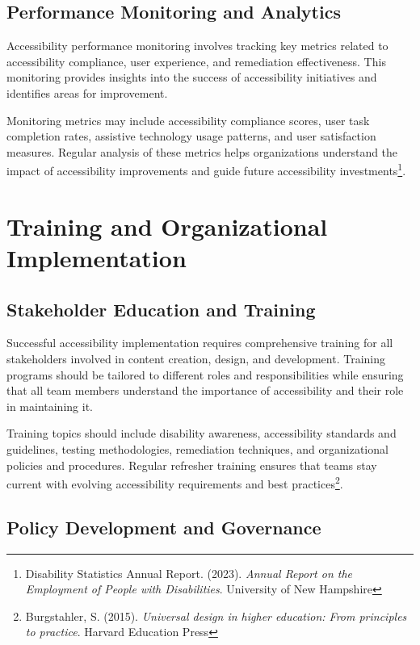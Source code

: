 \subsection{Performance Monitoring and Analytics}

Accessibility performance monitoring involves tracking key metrics related to accessibility compliance, user experience, and remediation effectiveness. This monitoring provides insights into the success of accessibility initiatives and identifies areas for improvement.

Monitoring metrics may include accessibility compliance scores, user task completion rates, assistive technology usage patterns, and user satisfaction measures. Regular analysis of these metrics helps organizations understand the impact of accessibility improvements and guide future accessibility investments\footnote{Disability Statistics Annual Report. (2023). \textit{Annual Report on the Employment of People with Disabilities}. University of New Hampshire}.

\section{Training and Organizational Implementation}\label{sec:training-org}

\subsection{Stakeholder Education and Training}

Successful accessibility implementation requires comprehensive training for all stakeholders involved in content creation, design, and development. Training programs should be tailored to different roles and responsibilities while ensuring that all team members understand the importance of accessibility and their role in maintaining it.

Training topics should include disability awareness, accessibility standards and guidelines, testing methodologies, remediation techniques, and organizational policies and procedures. Regular refresher training ensures that teams stay current with evolving accessibility requirements and best practices\footnote{Burgstahler, S. (2015). \textit{Universal design in higher education: From principles to practice}. Harvard Education Press}.

\subsection{Policy Development and Governance}

